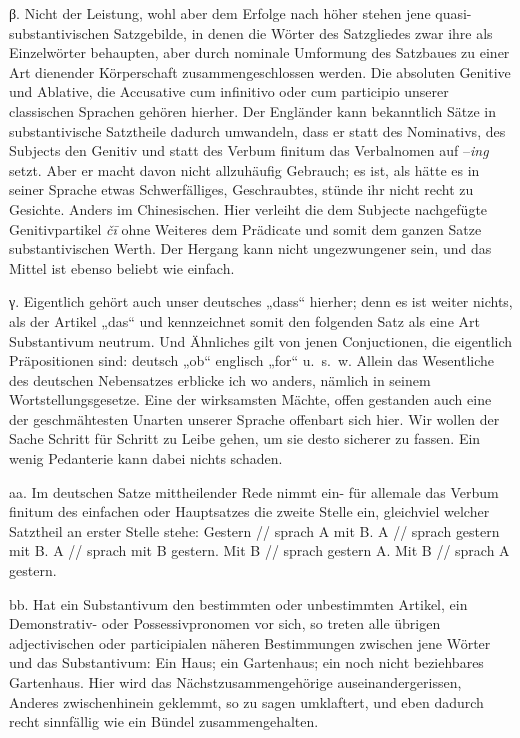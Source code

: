 β. Nicht der Leistung, wohl aber dem Erfolge nach höher stehen jene quasi-substantivischen Satzgebilde, in denen die Wörter des Satzgliedes zwar ihre  als Einzelwörter behaupten, aber durch nominale Umformung des Satzbaues zu einer Art dienender Körperschaft zusammengeschlossen werden. Die absoluten Genitive und Ablative, die Accusative cum infinitivo oder cum participio unserer classischen Sprachen gehören hierher. Der Engländer kann bekanntlich Sätze in substantivische Satztheile dadurch umwandeln, dass er statt des Nominativs, des Subjects den Genitiv und statt des Verbum finitum das Verbalnomen auf –\textit{ing} setzt. Aber er macht davon nicht allzuhäufig Gebrauch; es ist, als hätte es in seiner Sprache etwas Schwerfälliges, Geschraubtes, stünde ihr nicht recht zu Gesichte. Anders im Chinesischen. Hier verleiht die dem Subjecte nachgefügte Genitivpartikel \textit{čī} ohne Weiteres dem Prädicate und somit dem ganzen Satze substantivischen Werth. Der Hergang kann nicht ungezwungener sein, und das Mittel ist ebenso beliebt wie einfach.

γ. Eigentlich gehört auch unser deutsches „dass“ hierher; denn es ist weiter nichts, als der Artikel „das“ und kennzeichnet somit den folgenden Satz als eine Art Substantivum neutrum. Und Ähnliches gilt von jenen Conjuctionen, die eigentlich Präpositionen sind: deutsch „ob“ englisch „for“ u.~s.~w. Allein das Wesentliche des deutschen Nebensatzes erblicke ich wo anders, nämlich in seinem Wortstellungsgesetze. Eine der wirksamsten Mächte, offen gestanden auch eine der geschmähtesten Unarten unserer Sprache offenbart sich hier. Wir wollen der Sache Schritt für Schritt zu Leibe gehen, um sie desto sicherer zu fassen. Ein wenig Pedanterie kann dabei nichts schaden.

aa. Im deutschen Satze mittheilender Rede nimmt ein- für allemale das Verbum finitum des einfachen oder Hauptsatzes die zweite Stelle ein, gleichviel welcher Satztheil an erster Stelle stehe: Gestern // sprach A mit B. A // sprach \label{sp.468} gestern mit B. A // sprach mit B gestern. Mit B // sprach gestern A. Mit B // sprach A gestern.

bb. Hat ein Substantivum den bestimmten oder unbestimmten Artikel, ein Demonstrativ- oder Possessivpronomen vor sich, so treten alle übrigen adjectivischen oder participialen näheren Bestimmungen zwischen jene Wörter und das Substantivum: Ein Haus; ein Gartenhaus; ein  noch nicht beziehbares Gartenhaus. Hier wird das Nächstzusammengehörige auseinandergerissen, Anderes zwischenhinein geklemmt, so zu sagen umklaftert, und eben dadurch recht sinnfällig wie ein Bündel zusammengehalten.

